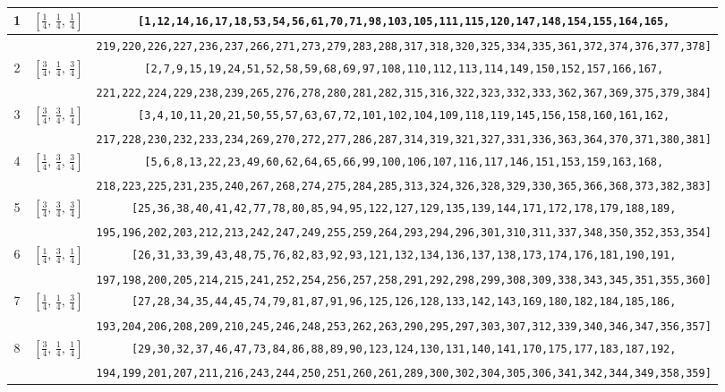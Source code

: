 \documentclass[fleqn,8pt]{jsarticle}
\begin{document}
\begin{longtable}{ccc}
1 & $\left[ \frac{1}{4},\, \frac{1}{4},\, \frac{1}{4} \right]$ & {\tt [1,12,14,16,17,18,53,54,56,61,70,71,98,103,105,111,115,120,147,148,154,155,164,165,} \\ \hline
 &  & {\tt 219,220,226,227,236,237,266,271,273,279,283,288,317,318,320,325,334,335,361,372,374,376,377,378]} \\ \hline
2 & $\left[ \frac{3}{4},\, \frac{1}{4},\, \frac{3}{4} \right]$ & {\tt [2,7,9,15,19,24,51,52,58,59,68,69,97,108,110,112,113,114,149,150,152,157,166,167,} \\ \hline
 &  & {\tt 221,222,224,229,238,239,265,276,278,280,281,282,315,316,322,323,332,333,362,367,369,375,379,384]} \\ \hline
3 & $\left[ \frac{3}{4},\, \frac{3}{4},\, \frac{1}{4} \right]$ & {\tt [3,4,10,11,20,21,50,55,57,63,67,72,101,102,104,109,118,119,145,156,158,160,161,162,} \\ \hline
 &  & {\tt 217,228,230,232,233,234,269,270,272,277,286,287,314,319,321,327,331,336,363,364,370,371,380,381]} \\ \hline
4 & $\left[ \frac{1}{4},\, \frac{3}{4},\, \frac{3}{4} \right]$ & {\tt [5,6,8,13,22,23,49,60,62,64,65,66,99,100,106,107,116,117,146,151,153,159,163,168,} \\ \hline
 &  & {\tt 218,223,225,231,235,240,267,268,274,275,284,285,313,324,326,328,329,330,365,366,368,373,382,383]} \\ \hline
5 & $\left[ \frac{3}{4},\, \frac{3}{4},\, \frac{3}{4} \right]$ & {\tt [25,36,38,40,41,42,77,78,80,85,94,95,122,127,129,135,139,144,171,172,178,179,188,189,} \\ \hline
 &  & {\tt 195,196,202,203,212,213,242,247,249,255,259,264,293,294,296,301,310,311,337,348,350,352,353,354]} \\ \hline
6 & $\left[ \frac{1}{4},\, \frac{3}{4},\, \frac{1}{4} \right]$ & {\tt [26,31,33,39,43,48,75,76,82,83,92,93,121,132,134,136,137,138,173,174,176,181,190,191,} \\ \hline
 &  & {\tt 197,198,200,205,214,215,241,252,254,256,257,258,291,292,298,299,308,309,338,343,345,351,355,360]} \\ \hline
7 & $\left[ \frac{1}{4},\, \frac{1}{4},\, \frac{3}{4} \right]$ & {\tt [27,28,34,35,44,45,74,79,81,87,91,96,125,126,128,133,142,143,169,180,182,184,185,186,} \\ \hline
 &  & {\tt 193,204,206,208,209,210,245,246,248,253,262,263,290,295,297,303,307,312,339,340,346,347,356,357]} \\ \hline
8 & $\left[ \frac{3}{4},\, \frac{1}{4},\, \frac{1}{4} \right]$ & {\tt [29,30,32,37,46,47,73,84,86,88,89,90,123,124,130,131,140,141,170,175,177,183,187,192,} \\ \hline
 &  & {\tt 194,199,201,207,211,216,243,244,250,251,260,261,289,300,302,304,305,306,341,342,344,349,358,359]} \\
\end{longtable}
\end{document}
